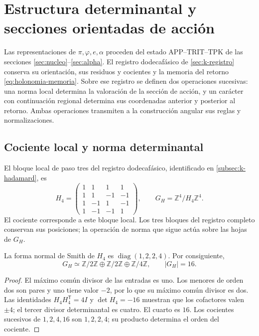 \section{Estructura determinantal y secciones orientadas de acción}
\label{iv:action:section}

Las representaciones de \(\pi,\varphi,e,\alpha\) proceden del estado
APP--TRIT--TPK de las secciones
\ref{sec:nucleo}--\ref{sec:alpha}. El registro dodecafásico de
\ref{sec:k-registro} conserva su orientación, sus residuos y
cocientes y la memoria del retorno
\eqref{eq:holonomia-memoria}. Sobre ese registro se definen dos operaciones
sucesivas: una norma local determina la valoración de la sección de
acción, y un carácter con continuación regional determina sus
coordenadas anterior y posterior al retorno. Ambas operaciones
transmiten a la construcción angular sus reglas y normalizaciones.

\subsection{Cociente local y norma determinantal}
\label{iv:action:determinantal}

El bloque local de paso tres del registro dodecafásico, identificado
en \ref{subsec:k-hadamard}, es
\begin{equation}
 H_4=\begin{pmatrix}
 1&1&1&1\\
 1&1&-1&-1\\
 1&-1&1&-1\\
 1&-1&-1&1
 \end{pmatrix},
 \qquad G_H=\mathbb Z^4/H_4\mathbb Z^4.
 \label{iv:action:h4}
\end{equation}
El cociente corresponde a este bloque local. Los tres bloques del
registro completo conservan sus posiciones; la operación de norma
que sigue actúa sobre las hojas de \(G_H\).

\begin{lemma}
\label{iv:action:smith}
La forma normal de Smith de \(H_4\) es
\(\operatorname{diag}(1,2,2,4)\). Por consiguiente,
\[
 G_H\simeq\mathbb Z/2\mathbb Z\oplus\mathbb Z/2\mathbb Z
       \oplus\mathbb Z/4\mathbb Z,\qquad |G_H|=16.
\]
\end{lemma}
\begin{proof}
El máximo común divisor de las entradas es uno. Los menores de
orden dos son pares y uno tiene valor \(-2\), por lo que su máximo
común divisor es dos. Las identidades
\(H_4H_4^{\mathsf T}=4I\) y \(\det H_4=-16\) muestran que los
cofactores valen \(\pm4\); el tercer divisor determinantal es
cuatro. El cuarto es \(16\). Los cocientes sucesivos de
\(1,2,4,16\) son \(1,2,2,4\); su producto determina el orden
del cociente.
\end{proof}

